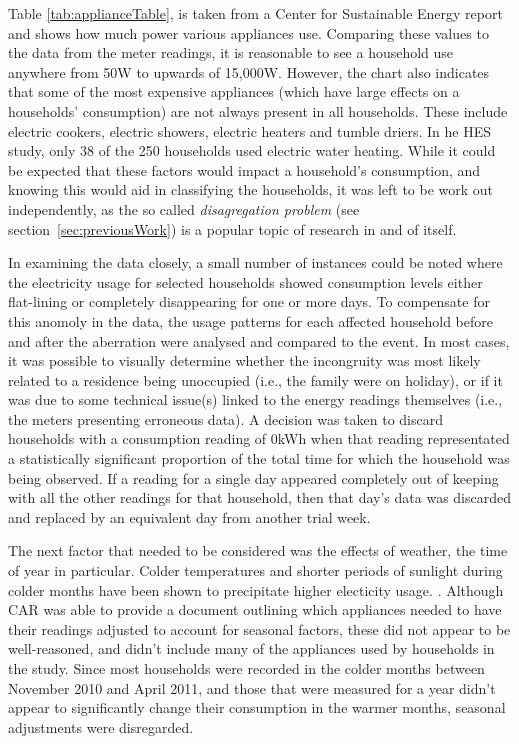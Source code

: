 \badHouseholds

Table \ref{tab:applianceTable}, is taken from a Center for Sustainable Energy \cite{CSE} report and shows how much power various appliances use. Comparing these values to the data from the meter readings, it is reasonable to see a household use anywhere from 50W to upwards of 15,000W. However, the chart also indicates that some of the most expensive appliances (which have large effects on a households' consumption) are not always present in all households. These include electric cookers, electric showers, electric heaters and tumble driers. In he HES study, only 38 of the 250 households used electric water heating. While it could be expected that these factors would impact a household's consumption, and knowing this would aid in classifying the households, it was left to be work out independently, as the so called \textit{disagregation problem} (see section~\ref{sec:previousWork}) is a popular topic of research in and of itself.

\applianceTable


In examining the data closely, a small number of instances could be noted where the electricity usage for selected households showed consumption levels either flat-lining or completely disappearing for one or more days.  To compensate for this anomoly in the data, the usage patterns for each affected household before and after the aberration were analysed and compared to the event.  In most cases, it was possible to visually determine whether the incongruity was most likely related to a residence being unoccupied (i.e., the family were on holiday), or if it was due to some technical issue(s) linked to the energy readings themselves (i.e., the meters presenting erroneous data).  A decision was taken to discard households with a consumption reading of 0kWh when that reading representated a statistically significant proportion of the total time for which the household was being observed.  If a reading for a single day appeared completely out of keeping with all the other readings for that household, then that day's data was discarded and replaced by an equivalent day from another trial week.

The next factor that needed to be considered was the effects of weather, the time of year in particular. Colder temperatures and shorter periods of sunlight during colder months have been shown to precipitate higher electicity usage.  \cite{DECC}. Although CAR was able to provide a document outlining which appliances needed to have their readings adjusted to account for seasonal factors, these did not appear to be well-reasoned, and didn't include many of the appliances used by households in the study. Since most households were recorded in the colder months between November 2010 and April 2011, and those that were measured for a year didn't appear to significantly change their consumption in the warmer months, seasonal adjustments were disregarded.

